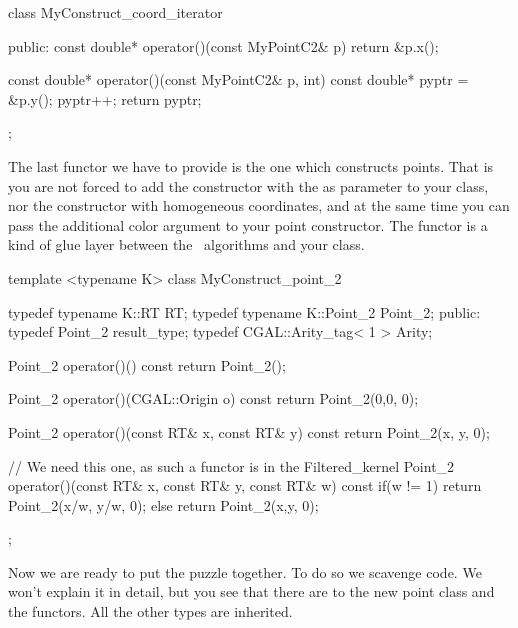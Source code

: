 \ccHtmlLinksOff
\begin{ccExampleCode}
class MyConstruct_coord_iterator {
public:
  const double* operator()(const MyPointC2& p)
  {
    return &p.x();
  }

  const double* operator()(const MyPointC2& p, int)
  {
    const double* pyptr = &p.y();
    pyptr++;
    return pyptr;
  }
};
\end{ccExampleCode}
\ccHtmlLinksOn

The last functor we have to provide is the one which constructs
points. That is you are not forced to add the constructor 
with the  as parameter to your class, nor the constructor with 
homogeneous coordinates, and at the same time you can 
pass the additional color argument to your point constructor.
The functor is a kind of glue layer between the \cgal\ algorithms
and your class.

\ccHtmlLinksOff
\begin{ccExampleCode}
 template <typename K>
  class MyConstruct_point_2
  {
    typedef typename K::RT         RT;
    typedef typename K::Point_2    Point_2;
  public:
    typedef Point_2          result_type;
    typedef CGAL::Arity_tag< 1 >   Arity;

    Point_2
    operator()() const
    { return Point_2(); }

    Point_2
    operator()(CGAL::Origin o) const
    { return Point_2(0,0, 0); }

    Point_2
    operator()(const RT& x, const RT& y) const
    { return Point_2(x, y, 0); }

    
    // We need this one, as such a functor is in the Filtered_kernel
    Point_2
    operator()(const RT& x, const RT& y, const RT& w) const
    { 
      if(w != 1){
	return Point_2(x/w, y/w, 0); 
      } else {
	return Point_2(x,y, 0);
      }
    }
  };

\end{ccExampleCode}
\ccHtmlLinksOn


Now we are ready to put the puzzle together. To do so we
scavenge code. We won't explain it in detail, but you see
that there are  to the new point class and
the functors. All the other types are inherited.

